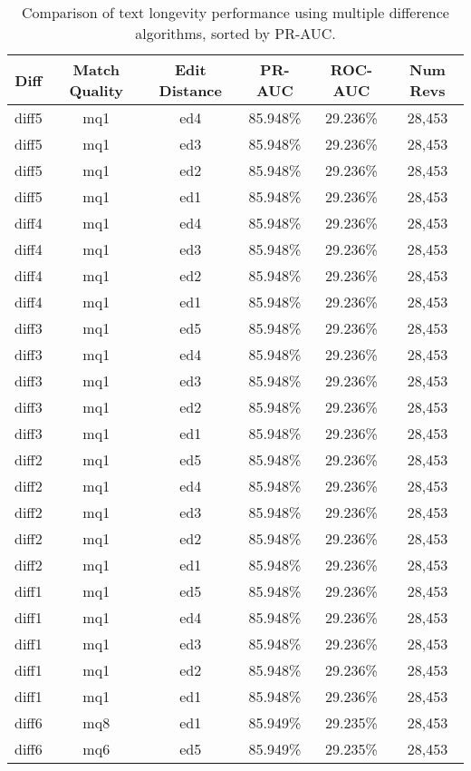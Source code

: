 \begin{table}[tbph]
\begin{center}
\begin{tabular}{|c|c|c||c|c|c|}
\hline
Diff & Match Quality & Edit Distance & PR-AUC & ROC-AUC & Num Revs \\
\hline
\hline
diff5 & mq1 & ed4 & 85.948\% & 29.236\% & 28,453 \\
diff5 & mq1 & ed3 & 85.948\% & 29.236\% & 28,453 \\
diff5 & mq1 & ed2 & 85.948\% & 29.236\% & 28,453 \\
diff5 & mq1 & ed1 & 85.948\% & 29.236\% & 28,453 \\
diff4 & mq1 & ed4 & 85.948\% & 29.236\% & 28,453 \\
diff4 & mq1 & ed3 & 85.948\% & 29.236\% & 28,453 \\
diff4 & mq1 & ed2 & 85.948\% & 29.236\% & 28,453 \\
diff4 & mq1 & ed1 & 85.948\% & 29.236\% & 28,453 \\
diff3 & mq1 & ed5 & 85.948\% & 29.236\% & 28,453 \\
diff3 & mq1 & ed4 & 85.948\% & 29.236\% & 28,453 \\
diff3 & mq1 & ed3 & 85.948\% & 29.236\% & 28,453 \\
diff3 & mq1 & ed2 & 85.948\% & 29.236\% & 28,453 \\
diff3 & mq1 & ed1 & 85.948\% & 29.236\% & 28,453 \\
diff2 & mq1 & ed5 & 85.948\% & 29.236\% & 28,453 \\
diff2 & mq1 & ed4 & 85.948\% & 29.236\% & 28,453 \\
diff2 & mq1 & ed3 & 85.948\% & 29.236\% & 28,453 \\
diff2 & mq1 & ed2 & 85.948\% & 29.236\% & 28,453 \\
diff2 & mq1 & ed1 & 85.948\% & 29.236\% & 28,453 \\
diff1 & mq1 & ed5 & 85.948\% & 29.236\% & 28,453 \\
diff1 & mq1 & ed4 & 85.948\% & 29.236\% & 28,453 \\
diff1 & mq1 & ed3 & 85.948\% & 29.236\% & 28,453 \\
diff1 & mq1 & ed2 & 85.948\% & 29.236\% & 28,453 \\
diff1 & mq1 & ed1 & 85.948\% & 29.236\% & 28,453 \\
diff6 & mq8 & ed1 & 85.949\% & 29.235\% & 28,453 \\
diff6 & mq6 & ed5 & 85.949\% & 29.235\% & 28,453 \\
\hline
\end{tabular}
\end{center}
\caption{Comparison of text longevity performance using
    multiple difference algorithms, sorted by PR-AUC.}
\label{tab:textshoutF}
\end{table}
